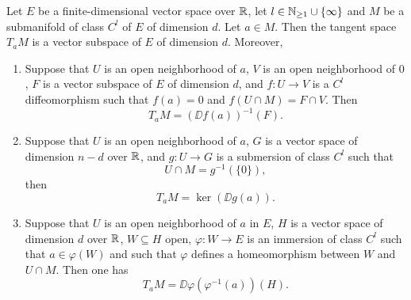 \begin{theoremenv}\label{thm:7.5.2}
    Let $E$ be a finite-dimensional vector space over $\mathbb{R}$, let $l \in \mathbb{N}_{\ge 1} \cup \{\infty\}$ and $M$ be a submanifold of class $C^l$ of $E$ of dimension $d$.
    Let $a \in M$.
    Then the tangent space $T_aM$ is a vector subspace of $E$ of dimension $d$.
    Moreover,
    \begin{enumerate}[label=(\arabic*)]
        \item Suppose that $U$ is an open neighborhood of $a$, $V$ is an open neighborhood of $0$, $F$ is a vector subspace of $E$ of dimension $d$, and $f : U \longrightarrow V$ is a $C^l$ diffeomorphism such that $f(a) = 0$ and $f(U \cap M) = F \cap V$.
            Then
            $$T_aM = \left(\DD f(a)\right)^{-1}(F).$$
        \item Suppose that $U$ is an open neighborhood of $a$, $G$ is a vector space of dimension $n - d$ over $\mathbb{R}$, and $g : U \longrightarrow G$ is a submersion of class $C^l$ such that
            $$U \cap M = g^{-1}(\{0\}),$$
            then
            $$T_aM = \ker\left(\DD g(a)\right).$$
        \item Suppose that $U$ is an open neighborhood of $a$ in $E$,
            $H$ is a vector space of dimension $d$ over $\mathbb{R}$, $W \subseteq H$ open, $\varphi : W \longrightarrow E$ is an immersion of class $C^l$ such that
            $a \in \varphi(W)$ and such that $\varphi$ defines a homeomorphism between $W$ and $U \cap M$.
            Then one has
            $$T_a M = \DD \varphi\left(\varphi^{-1}(a)\right)(H).$$
    \end{enumerate}
    \begin{figure}[H]
        \centering

\end{figure}
\end{theoremenv}
